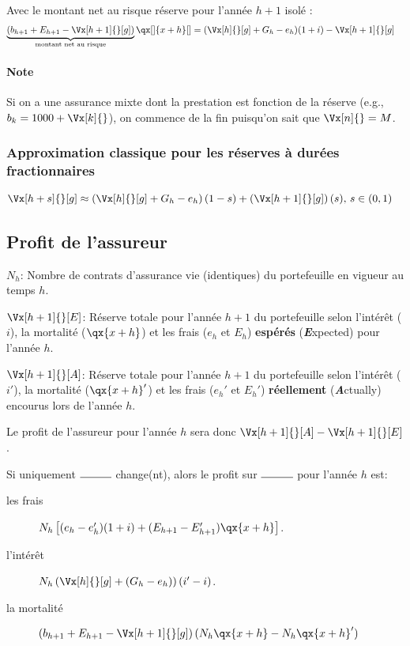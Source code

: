\documentclass[10pt, french]{article}
\begin{document}
\begin{multicols*}{2}
Avec le montant net au risque réserve pour l'année $h + 1$ isolé :
\begin{align*}
	\underbrace{(b_{h + 1} + E_{h + 1} - \Vx[h + 1]{}[g])}_{\text{montant net au risque}} \qx[]{x+h}[]
	&= 	(\Vx[h]{}[g] + G_h - e_h)(1 + i) - \Vx[h + 1]{}[g]
\end{align*}

\paragraph*{Note}	Si on a une assurance mixte dont la prestation est fonction de la réserve (e.g., $b_{k} = 1000 + \Vx[k]{}$), on commence de la fin puisqu'on sait que $\Vx[n]{} = M$.

\subsubsection*{Approximation classique pour les réserves à durées fractionnaires}
\begin{align*}
	\Vx[h + s]{}[g]
	&\approx	\left(\Vx[h]{}[g] + G_h - e_h\right)(1 - s) + \left(\Vx[h + 1]{}[g]\right)(s), \, s \in (0, 1)
\end{align*}

\subsection*{Profit de l'assureur}
\begin{distributions}[Notation]
\begin{description}
	\item[]	$N_{h}$: Nombre de contrats d'assurance vie (identiques) du portefeuille en vigueur au temps $h$.
	\item[]	$\Vx[h + 1]{}[E]$: Réserve totale pour l'année $h + 1$ du portefeuille selon l'intérêt ($i$), la mortalité ($\qx{x + h}$) et les frais ($e_{h}$ et $E_{h}$) \textbf{espérés} (\textit{\textbf{E}}xpected) pour l'année $h$.
	\item[]	$\Vx[h + 1]{}[A]$: Réserve totale pour l'année $h + 1$ du portefeuille selon l'intérêt ($i'$), la mortalité ($\qx{x + h}'$) et les frais ($e_{h}'$ et $E_{h}'$) \textbf{réellement} (\textit{\textbf{A}}ctually) encourus lors de l'année $h$.
	\item	Le profit de l'assureur pour l'année $h$ sera donc $\Vx[h + 1]{}[A] - \Vx[h + 1]{}[E]$.
\end{description}
\end{distributions}

Si uniquement $\rule{1cm}{0.15mm}$ change(nt), alors le profit sur $\rule{1cm}{0.15mm}$ pour l'année $h$ est:
\begin{description}
	\item[les frais]	$N_{h}\left[ (e_{h} - e_{h}')(1 + i) + (E_{h + 1} - E_{h + 1}')\qx{x + h} \right]$.
	\item[l'intérêt]	$N_{h} \left( \Vx[h]{}[g] + (G_{h} - e_{h}) \right) (i' - i)$.
	\item[la mortalité]	$\left( b_{h + 1} + E_{h + 1} - \Vx[h + 1]{}[g] \right)(N_{h}\qx{x + h} - N_{h}\qx{x + h}')$
\end{description}


\end{multicols*}
\end{document}
